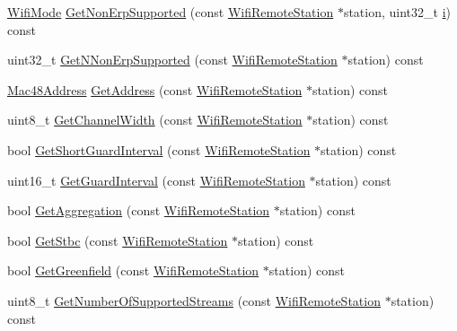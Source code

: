 \begin{DoxyCompactItemize}
\item 
\hyperlink{classns3_1_1WifiMode}{Wifi\+Mode} \hyperlink{classns3_1_1WifiRemoteStationManager_a3df8f1931f1fce653e5990a2821b44c6}{Get\+Non\+Erp\+Supported} (const \hyperlink{structns3_1_1WifiRemoteStation}{Wifi\+Remote\+Station} $\ast$station, uint32\+\_\+t \hyperlink{lte__uplink__power__control_8m_a6f6ccfcf58b31cb6412107d9d5281426}{i}) const 
\item 
uint32\+\_\+t \hyperlink{classns3_1_1WifiRemoteStationManager_a4428b71c94d77a388adbd319fe863809}{Get\+N\+Non\+Erp\+Supported} (const \hyperlink{structns3_1_1WifiRemoteStation}{Wifi\+Remote\+Station} $\ast$station) const 
\item 
\hyperlink{classns3_1_1Mac48Address}{Mac48\+Address} \hyperlink{classns3_1_1WifiRemoteStationManager_ac9ccc8c514bd8d2af05c290e63461a2a}{Get\+Address} (const \hyperlink{structns3_1_1WifiRemoteStation}{Wifi\+Remote\+Station} $\ast$station) const 
\item 
uint8\+\_\+t \hyperlink{classns3_1_1WifiRemoteStationManager_a918213c5b9fa629c4986f6d90521bbd4}{Get\+Channel\+Width} (const \hyperlink{structns3_1_1WifiRemoteStation}{Wifi\+Remote\+Station} $\ast$station) const 
\item 
bool \hyperlink{classns3_1_1WifiRemoteStationManager_aa55f6cb04128c88710119c8289f1b17e}{Get\+Short\+Guard\+Interval} (const \hyperlink{structns3_1_1WifiRemoteStation}{Wifi\+Remote\+Station} $\ast$station) const 
\item 
uint16\+\_\+t \hyperlink{classns3_1_1WifiRemoteStationManager_a2dc8c1bf09e704aabee3de5299f9caae}{Get\+Guard\+Interval} (const \hyperlink{structns3_1_1WifiRemoteStation}{Wifi\+Remote\+Station} $\ast$station) const 
\item 
bool \hyperlink{classns3_1_1WifiRemoteStationManager_a5421c8d510cb16eebeac9f2ea9dd73c3}{Get\+Aggregation} (const \hyperlink{structns3_1_1WifiRemoteStation}{Wifi\+Remote\+Station} $\ast$station) const 
\item 
bool \hyperlink{classns3_1_1WifiRemoteStationManager_a82a949f8052408e1aaf7beeb47032c38}{Get\+Stbc} (const \hyperlink{structns3_1_1WifiRemoteStation}{Wifi\+Remote\+Station} $\ast$station) const 
\item 
bool \hyperlink{classns3_1_1WifiRemoteStationManager_ab7400cba37fd42603a302eb541787f6f}{Get\+Greenfield} (const \hyperlink{structns3_1_1WifiRemoteStation}{Wifi\+Remote\+Station} $\ast$station) const 
\item 
uint8\+\_\+t \hyperlink{classns3_1_1WifiRemoteStationManager_a5b08585f67c512242a2f3a53eeedade3}{Get\+Number\+Of\+Supported\+Streams} (const \hyperlink{structns3_1_1WifiRemoteStation}{Wifi\+Remote\+Station} $\ast$station) const 

\end{DoxyCompactItemize}
